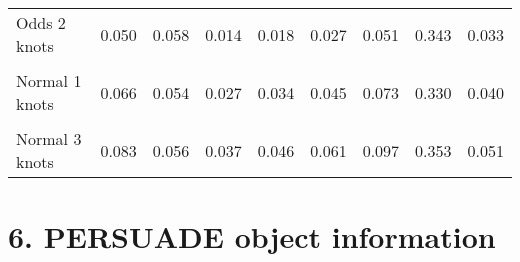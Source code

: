 \documentclass[
]{article}
\begin{document}
\begin{table}[H]
{\begin{tabular}[t]{lrrrrrrrr}
Odds 2 knots & 0.050 & 0.058 & 0.014 & 0.018 & 0.027 & 0.051 & 0.343 & 0.033\\
\cellcolor{gray!10}{Odds 3 knots} & \cellcolor{gray!10}{0.056} & \cellcolor{gray!10}{0.060} & \cellcolor{gray!10}{0.016} & \cellcolor{gray!10}{0.021} & \cellcolor{gray!10}{0.031} & \cellcolor{gray!10}{0.060} & \cellcolor{gray!10}{0.363} & \cellcolor{gray!10}{0.039}\\
Normal 1 knots & 0.066 & 0.054 & 0.027 & 0.034 & 0.045 & 0.073 & 0.330 & 0.040\\
\cellcolor{gray!10}{Normal 2 knots} & \cellcolor{gray!10}{0.067} & \cellcolor{gray!10}{0.054} & \cellcolor{gray!10}{0.028} & \cellcolor{gray!10}{0.035} & \cellcolor{gray!10}{0.047} & \cellcolor{gray!10}{0.075} & \cellcolor{gray!10}{0.327} & \cellcolor{gray!10}{0.040}\\
Normal 3 knots & 0.083 & 0.056 & 0.037 & 0.046 & 0.061 & 0.097 & 0.353 & 0.051\\
\bottomrule
\end{tabular}}
\end{table}

\clearpage

\section{6. PERSUADE object
information}\label{persuade-object-information}
\end{document}
